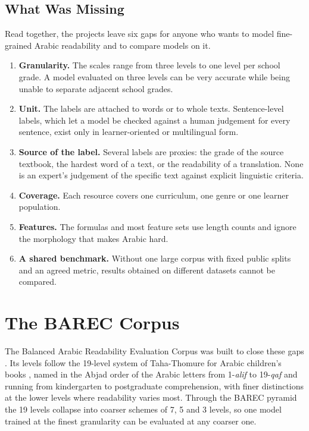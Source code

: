 \subsection{What Was Missing}
\label{sec:lit-gaps}

Read together, the projects leave six gaps for anyone who wants to model fine-grained Arabic
readability and to compare models on it.

\begin{enumerate}
\item \textbf{Granularity.} The scales range from three levels to one level per school grade.
A model evaluated on three levels can be very accurate while being unable to separate adjacent
school grades.
\item \textbf{Unit.} The labels are attached to words or to whole texts. Sentence-level labels,
which let a model be checked against a human judgement for every sentence, exist only in
learner-oriented or multilingual form.
\item \textbf{Source of the label.} Several labels are proxies: the grade of the source
textbook, the hardest word of a text, or the readability of a translation. None is an expert's
judgement of the specific text against explicit linguistic criteria.
\item \textbf{Coverage.} Each resource covers one curriculum, one genre or one learner
population.
\item \textbf{Features.} The formulas and most feature sets use length counts and ignore the
morphology that makes Arabic hard.
\item \textbf{A shared benchmark.} Without one large corpus with fixed public splits and an agreed
metric, results obtained on different datasets cannot be compared.
\end{enumerate}

\section{The BAREC Corpus}
\label{sec:lit-barec}

The Balanced Arabic Readability Evaluation Corpus was built to close these gaps
\cite{elmadani2025barec,habash2025guidelines}. Its levels follow the 19-level system of
Taha-Thomure for Arabic children's books \cite{tahathomure2017}, named in the Abjad order of the
Arabic letters from 1-\textit{alif} to 19-\textit{qaf} and running from kindergarten to
postgraduate comprehension, with finer distinctions at the lower levels where readability varies
most. Through the BAREC pyramid the 19 levels collapse into coarser schemes of 7, 5 and 3 levels,
so one model trained at the finest granularity can be evaluated at any coarser one.

